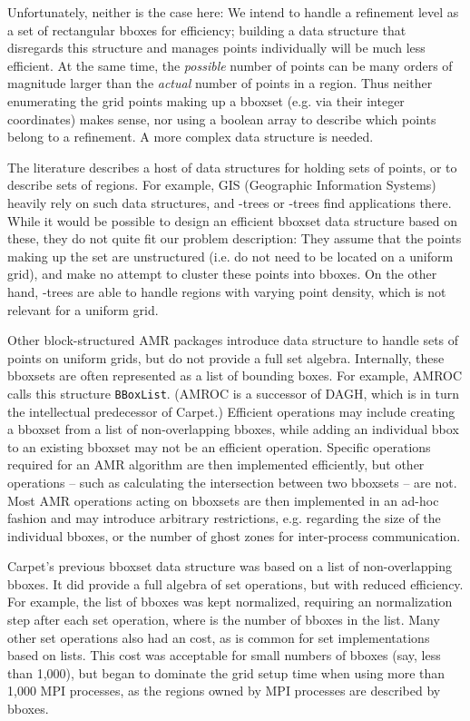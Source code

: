 \documentclass[conference]{IEEEtran}
\begin{document}
Unfortunately, neither is the case here: We intend to handle a
refinement level as a set of rectangular bboxes for efficiency;
building a data
structure that disregards this structure and manages points
individually will be much less efficient. At the same time, the
\emph{possible} number of points can be many orders of magnitude
larger than the \emph{actual} number of points in a region. Thus neither
enumerating the grid points making up a bboxset (e.g. via their
integer coordinates) makes sense, nor using a boolean array to
describe which points belong to a refinement.
A more complex data structure is needed.

The literature describes a host of data structures for holding sets of
points, or
to describe sets of regions. For example, GIS (Geographic Information
Systems) heavily rely on such data structures, and -trees or
-trees \cite{wiki:rstar-tree} find applications there. While it
would be possible to design an efficient bboxset data structure
based on these, they do not quite fit our problem
description: They assume that the points making up the set are
unstructured (i.e. do not need to be located on a uniform grid), and make no
attempt to cluster these points into bboxes. On the other hand,
-trees are able to handle regions with varying point density,
which is not relevant for a uniform grid.

Other block-structured AMR packages introduce data structure to handle
sets of points on uniform grids, but do not provide a full set
algebra. Internally, these bboxsets are often represented as a list of
bounding boxes. For example, AMROC \cite{amrocweb} calls this
structure \verb+BBoxList+. (AMROC is a successor of DAGH, which is in
turn the intellectual predecessor of Carpet.)
Efficient operations may include creating a bboxset from a list of
non-overlapping bboxes, while adding an individual bbox to an existing
bboxset may not be an efficient operation. Specific operations required
for an AMR algorithm are then implemented efficiently, but other
operations -- such as calculating the intersection between two
bboxsets -- are not. Most AMR operations acting on bboxsets are then
implemented in an ad-hoc fashion and may introduce arbitrary
restrictions, e.g. regarding the size of the individual bboxes, or the
number of ghost zones for inter-process communication.

Carpet's previous bboxset data structure was based on a list of
non-overlapping bboxes. It did provide a full algebra of set
operations, but with reduced efficiency. For example, the list of
bboxes was kept normalized, requiring an  normalization step after
each set operation, where  is the number of bboxes in the list.
Many other set
operations also had an  cost, as is common for set
implementations based on lists. This cost was acceptable for small
numbers of bboxes (say, less than 1,000), but began to dominate the
grid setup time when using more than 1,000 MPI processes, as the
regions owned by MPI processes are described by bboxes.
\end{document}
